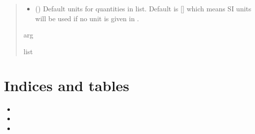 \documentclass[letterpaper,10pt,english]{sphinxmanual}
\begin{document}
\begin{fulllineitems}
\begin{quote}
\begin{description}
\begin{itemize}
\item {} 
\sphinxAtStartPar
{} (\sphinxstyleliteralemphasis{\sphinxupquote{, }}) \textendash{} Default units for quantities in  list. Default is {[}{]} which means SI units will be used if no unit is given in .

\end{itemize}

\sphinxAtStartPar
arg

\sphinxAtStartPar
list

\end{description}\end{quote}

\end{fulllineitems}


\begin{fulllineitems}
\label{\detokenize{components:components.thermal_conductance_of_via_farm_view}}
\pysigstartsignatures
{}
\pysigstopsignatures
\end{fulllineitems}



\chapter{Indices and tables}
\label{\detokenize{index:indices-and-tables}}\begin{itemize}
\item {} 
\sphinxAtStartPar
{}

\item {} 
\sphinxAtStartPar
{}

\item {} 
\sphinxAtStartPar
{}

\end{itemize}


\renewcommand{\indexname}{Python Module Index}
\begin{sphinxtheindex}
\let\bigletter\sphinxstyleindexlettergroup
\bigletter{c}
\item\relax{}
\indexspace
\bigletter{t}
\item\relax{}
\end{sphinxtheindex}

\renewcommand{\indexname}{Index}
\printindex
\end{document}
